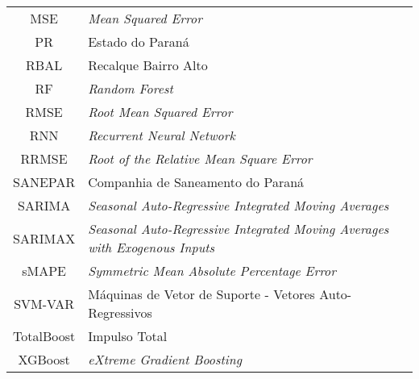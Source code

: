 \begin{tabular}{cp{}}
	MSE & \textit{Mean Squared Error}\\
	PR & Estado do Paraná\\
	RBAL & Recalque Bairro Alto\\
	RF & \textit{Random Forest}\\
	RMSE & \textit{Root Mean Squared Error}\\
	RNN & \textit{Recurrent Neural Network}\\
	RRMSE & \textit{Root of the Relative Mean Square Error}\\
	SANEPAR & Companhia de Saneamento do Paraná \\
	SARIMA & \textit{Seasonal Auto-Regressive Integrated Moving Averages} \\
	SARIMAX & \textit{Seasonal Auto-Regressive Integrated Moving Averages with Exogenous Inputs} \\
	sMAPE &  \textit{Symmetric Mean Absolute Percentage Error}\\
	SVM-VAR & Máquinas de Vetor de Suporte - Vetores Auto-Regressivos\\
	TotalBoost & Impulso Total\\
	XGBoost & \textit{eXtreme Gradient Boosting}
\end{tabular}
